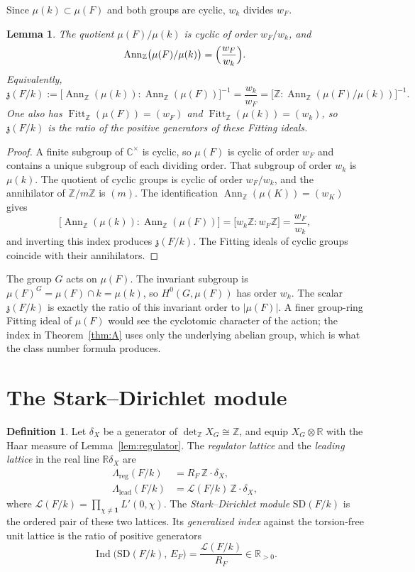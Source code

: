 \documentclass[11pt]{article}
\theoremstyle{plain}
\newtheorem{lemma}[theorem]{Lemma}
\theoremstyle{definition}
\newtheorem{definition}[theorem]{Definition}
\theoremstyle{remark}
\newcommand{\Z}{\mathbb{Z}}
\newcommand{\R}{\mathbb{R}}
\newcommand{\C}{\mathbb{C}}
\newcommand{\Ann}{\operatorname{Ann}}
\newcommand{\Fitt}{\operatorname{Fitt}}
\newcommand{\Ind}{\operatorname{Ind}}
\newcommand{\triv}{\mathbf{1}}
\newcommand{\SD}{\mathrm{SD}}
\begin{document}
Since $\mu(k)\subset\mu(F)$ and both groups are cyclic, $w_k$ divides $w_F$.

\begin{lemma}
\label{lem:ann}
The quotient $\mu(F)/\mu(k)$ is cyclic of order $w_F/w_k$, and
\[
  \Ann_{\Z}\bigl(\mu(F)/\mu(k)\bigr)=\Bigl(\frac{w_F}{w_k}\Bigr).
\]
Equivalently,
\[
  \mathfrak{z}(F/k)
  :=\bigl[\Ann_{\Z}(\mu(k)):\Ann_{\Z}(\mu(F))\bigr]^{-1}
  =\frac{w_k}{w_F}
  =\bigl[\Z:\Ann_{\Z}(\mu(F)/\mu(k))\bigr]^{-1}.
\]
One also has $\Fitt_{\Z}(\mu(F))=(w_F)$ and $\Fitt_{\Z}(\mu(k))=(w_k)$, so $\mathfrak{z}(F/k)$ is the ratio of the positive generators of these Fitting ideals.
\end{lemma}

\begin{proof}
A finite subgroup of $\C^{\times}$ is cyclic, so $\mu(F)$ is cyclic of order $w_F$ and contains a unique subgroup of each dividing order.
That subgroup of order $w_k$ is $\mu(k)$.
The quotient of cyclic groups is cyclic of order $w_F/w_k$, and the annihilator of $\Z/m\Z$ is $(m)$.
The identification $\Ann_{\Z}(\mu(K))=(w_K)$ gives
\[
  \bigl[\Ann_{\Z}(\mu(k)):\Ann_{\Z}(\mu(F))\bigr]
  =\bigl[w_k\Z:w_F\Z\bigr]
  =\frac{w_F}{w_k},
\]
and inverting this index produces $\mathfrak{z}(F/k)$.
The Fitting ideals of cyclic groups coincide with their annihilators.
\end{proof}

The group $G$ acts on $\mu(F)$.
The invariant subgroup is $\mu(F)^{G}=\mu(F)\cap k=\mu(k)$, so $H^{0}(G,\mu(F))$ has order $w_k$.
The scalar $\mathfrak{z}(F/k)$ is exactly the ratio of this invariant order to $|\mu(F)|$.
A finer group-ring Fitting ideal of $\mu(F)$ would see the cyclotomic character of the action; the index in Theorem~\ref{thm:A} uses only the underlying abelian group, which is what the class number formula produces.

\section{The Stark--Dirichlet module}
\label{sec:thmA}

\begin{definition}
\label{def:sd}
Let $\delta_X$ be a generator of $\det_{\Z}X_G\cong\Z$, and equip $X_G\otimes\R$ with the Haar measure of Lemma~\ref{lem:regulator}.
The \emph{regulator lattice} and the \emph{leading lattice} in the real line $\R\delta_X$ are
\begin{align*}
  \Lambda_{\mathrm{reg}}(F/k)
    &=R_F\,\Z\cdot\delta_X,\\
  \Lambda_{\mathrm{lead}}(F/k)
    &=\mathcal{L}(F/k)\,\Z\cdot\delta_X,
\end{align*}
where $\mathcal{L}(F/k)=\prod_{\chi\neq\triv}L'(0,\chi)$.
The \emph{Stark--Dirichlet module} $\SD(F/k)$ is the ordered pair of these two lattices.
Its \emph{generalized index} against the torsion-free unit lattice is the ratio of positive generators
\begin{equation}
\label{eq:ind}
  \Ind\bigl(\SD(F/k),\,E_F\bigr)
  =\frac{\mathcal{L}(F/k)}{R_F}\in\R_{>0}.
\end{equation}
\end{definition}
\end{document}
